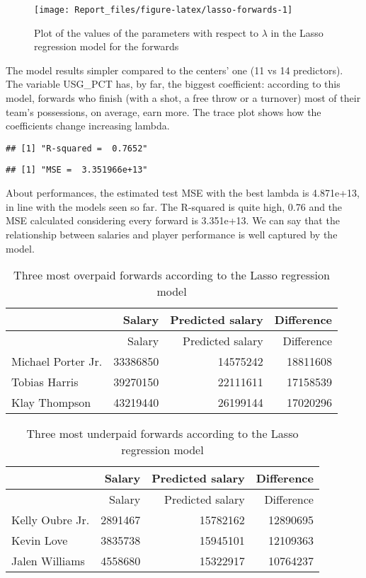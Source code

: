\documentclass[
]{article}
\begin{document}
\begin{figure}

{\centering \texttt{[image: Report\_files/figure-latex/lasso-forwards-1]} 

}

\caption{Plot of the values of the parameters with respect to $\lambda$ in the Lasso regression model for the forwards}\label{fig:lasso-forwards}
\end{figure}

The model results simpler compared to the centers' one (11 vs 14
predictors). The variable USG\_PCT has, by far, the biggest coefficient:
according to this model, forwards who finish (with a shot, a free throw
or a turnover) most of their team's possessions, on average, earn more.
The trace plot shows how the coefficients change increasing lambda.

\begin{verbatim}
## [1] "R-squared =  0.7652"
\end{verbatim}

\begin{verbatim}
## [1] "MSE =  3.351966e+13"
\end{verbatim}

About performances, the estimated test MSE with the best lambda is
4.871e+13, in line with the models seen so far. The R-squared is quite
high, 0.76 and the MSE calculated considering every forward is
3.351e+13. We can say that the relationship between salaries and player
performance is well captured by the model.

\begin{longtable}[]{@{}lrrr@{}}
\caption{Three most overpaid forwards according to the Lasso regression
model}\tabularnewline
\toprule()
& Salary & Predicted salary & Difference \\
\midrule()
\endfirsthead
\toprule()
& Salary & Predicted salary & Difference \\
\midrule()
\endhead
Michael Porter Jr. & 33386850 & 14575242 & 18811608 \\
Tobias Harris & 39270150 & 22111611 & 17158539 \\
Klay Thompson & 43219440 & 26199144 & 17020296 \\
\bottomrule()
\end{longtable}

\begin{longtable}[]{@{}lrrr@{}}
\caption{Three most underpaid forwards according to the Lasso regression
model}\tabularnewline
\toprule()
& Salary & Predicted salary & Difference \\
\midrule()
\endfirsthead
\toprule()
& Salary & Predicted salary & Difference \\
\midrule()
\endhead
Kelly Oubre Jr. & 2891467 & 15782162 & 12890695 \\
Kevin Love & 3835738 & 15945101 & 12109363 \\
Jalen Williams & 4558680 & 15322917 & 10764237 \\
\bottomrule()
\end{longtable}
\end{document}
